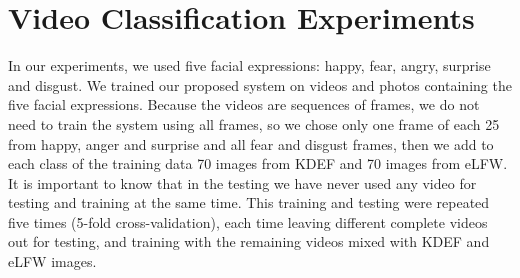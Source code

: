 












%    
%    


\section{Video Classification Experiments}
\label{sec:Vid_Experiments}
In our experiments, we used five facial expressions: happy, fear, angry, surprise and disgust. We trained our proposed system on videos and photos containing the five facial expressions. Because the videos are sequences of frames, we do not need to train the system using all frames,  so we chose only one frame of each 25 from happy, anger and surprise and all fear and disgust frames, then we add to each class of the training data 70 images from KDEF and 70 images from eLFW. It is important to know that in the testing we have never used any video for testing and training at the same time. This training and testing were repeated five times (5-fold cross-validation), each time leaving different complete videos out for testing, and training with the remaining videos mixed with KDEF and eLFW images. 

